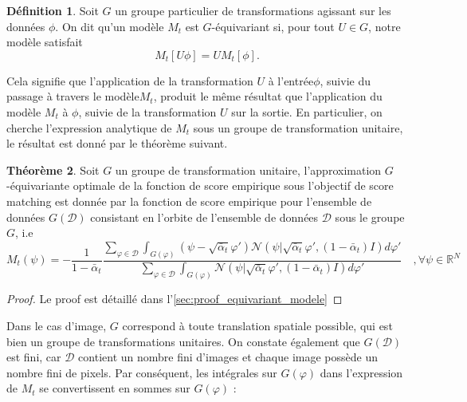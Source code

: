 \documentclass[a4paper,10pt]{article}
\theoremstyle{definition} %
\newtheorem{definition}{Définition}[section]
\theoremstyle{definition} %
\theoremstyle{definition} %
\newtheorem{theorem}[definition]{Théorème}
\theoremstyle{definition} %
\newcommand{\R}{\mathbb{R}}
\begin{document}
\begin{definition}
Soit \( G \) un groupe particulier de transformations agissant sur les données \( \phi \). On dit qu'un modèle \( M_t \) est \( G \)-équivariant si, pour tout \( U \in G \), notre modèle satisfait
\vspace{-5pt}
\begin{equation*}
    M_t[U\phi] = UM_t[\phi].
\end{equation*}
\end{definition}

Cela signifie que l'application de la transformation $U$ à l'entrée$\phi$, suivie du passage à travers le modèle$M_t$, produit le même résultat que l'application du modèle $M_t$ à $\phi$, suivie de la transformation $U$ sur la sortie. En particulier, on cherche l'expression analytique de $M_t$ sous un groupe de transformation unitaire, le résultat est donné par le théorème suivant.


\begin{theorem}\label{theo:equivariant_modele}
Soit $G$ un groupe de transformation unitaire, l'approximation \( G \)-équivariante optimale de la fonction de score empirique sous l'objectif de score matching est donnée par la fonction de score empirique pour l'ensemble de données \( G(\mathcal{D}) \) consistant en l'orbite de l'ensemble de données \( \mathcal{D} \) sous le groupe \( G \), i.e 
\begin{equation}\label{eq:model_sous_equivariant_contraint}
    M_t(\psi) = -\frac{1}{1-\bar \alpha_t} \frac{\sum\limits_{\varphi \in \mathcal{D}} \int_{G(\varphi)} (\psi - \sqrt{\bar \alpha_t} \varphi') \mathcal{N}(\psi | \sqrt{\bar \alpha_t} \varphi', (1-\bar \alpha_t) I) d\varphi'}{\sum\limits_{\varphi \in \mathcal{D}} \int_{G(\varphi)} \mathcal{N}(\psi | \sqrt{\bar \alpha_t} \varphi', (1-\bar \alpha_t) I) d\varphi'} \quad ,\forall\psi \in \R^N
\end{equation}
\end{theorem}

\begin{proof}
    Le proof est détaillé dans l'\cref{sec:proof_equivariant_modele}
\end{proof}

Dans le cas d'image, $G$ correspond à toute translation spatiale possible, qui est bien un groupe de transformations unitaires. On constate également que $G(\mathcal{D})$ est fini, car $\mathcal{D}$ contient un nombre fini d'images et chaque image possède un nombre fini de pixels. Par conséquent, les intégrales sur $G(\varphi)$ dans l'expression de $M_t$ se convertissent en sommes sur $G(\varphi)$ :
\end{document}
